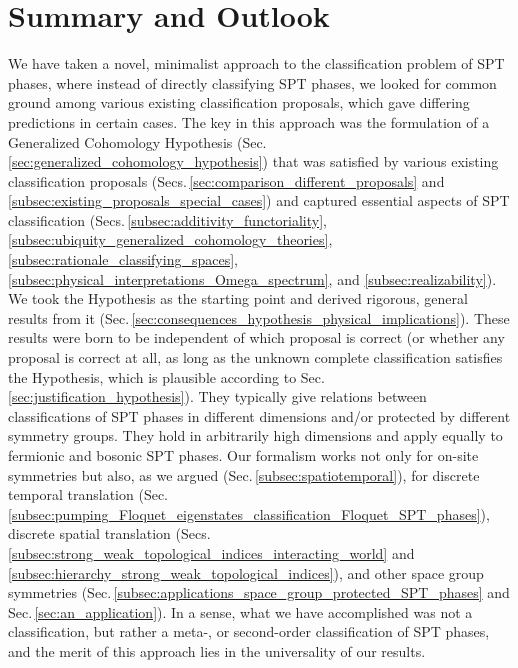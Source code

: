 \documentclass[sort&compress]{elsarticle}
\theoremstyle{theoremstyle}
\theoremstyle{framedtheoremstyle}
\theoremstyle{definitionstyle}
\theoremstyle{definitionstyle}
\theoremstyle{definitionstyle}
\theoremstyle{definitionstyle}
\theoremstyle{nameddefinitionstyle}
\theoremstyle{framednameddefinitionstyle}
\theoremstyle{proofstyle}
\theoremstyle{definitionstyle}
\begin{document}
\section{Summary and Outlook\label{sec:summary_outlook}}

We have taken a novel, minimalist approach to the classification problem of SPT phases, where instead of directly classifying SPT phases, we looked for common ground among various existing classification proposals, which gave differing predictions in certain cases. The key in this approach was the formulation of a Generalized Cohomology Hypothesis (Sec.\,\ref{sec:generalized_cohomology_hypothesis}) that was satisfied by various existing classification proposals (Secs.\,\ref{sec:comparison_different_proposals} and \ref{subsec:existing_proposals_special_cases}) and captured essential aspects of SPT classification (Secs.\,\ref{subsec:additivity_functoriality}, \ref{subsec:ubiquity_generalized_cohomology_theories}, \ref{subsec:rationale_classifying_spaces}, \ref{subsec:physical_interpretations_Omega_spectrum}, and \ref{subsec:realizability}). We took the Hypothesis as the starting point and derived rigorous, general results from it (Sec.\,\ref{sec:consequences_hypothesis_physical_implications}). These results were born to be independent of which proposal is correct (or whether any proposal is correct at all, as long as the unknown complete classification satisfies the Hypothesis, which is plausible according to Sec.\,\ref{sec:justification_hypothesis}). They typically give relations between classifications of SPT phases in different dimensions and/or protected by different symmetry groups. They hold in arbitrarily high dimensions and apply equally to fermionic and bosonic SPT phases. Our formalism works not only for on-site symmetries but also, as we argued (Sec.\,\ref{subsec:spatiotemporal}), for discrete temporal translation (Sec.\,\ref{subsec:pumping_Floquet_eigenstates_classification_Floquet_SPT_phases}), discrete spatial translation (Secs.\,\ref{subsec:strong_weak_topological_indices_interacting_world} and \ref{subsec:hierarchy_strong_weak_topological_indices}), and other space group symmetries (Sec.\,\ref{subsec:applications_space_group_protected_SPT_phases} and Sec.\,\ref{sec:an_application}). In a sense, what we have accomplished was not a classification, but rather a meta-, or second-order classification of SPT phases, and the merit of this approach lies in the universality of our results.
\end{document}
